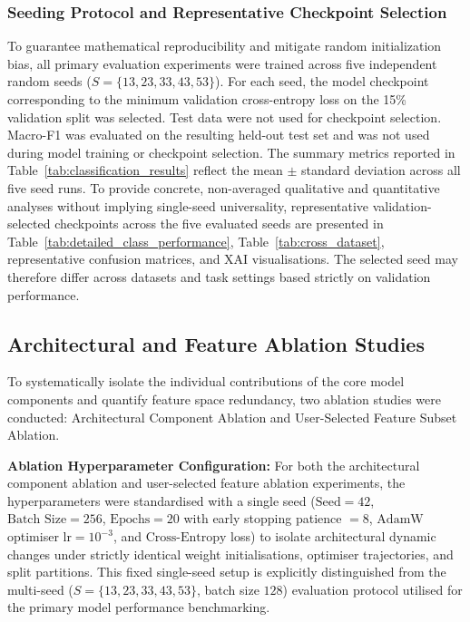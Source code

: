 \documentclass[a4paper,fleqn]{cas-sc}
\begin{document}
\subsubsection{Seeding Protocol and Representative Checkpoint Selection}
To guarantee mathematical reproducibility and mitigate random initialization bias, all primary evaluation experiments were trained across five independent random seeds ($S = \{13, 23, 33, 43, 53\}$). For each seed, the model checkpoint corresponding to the minimum validation cross-entropy loss on the 15\% validation split was selected. Test data were not used for checkpoint selection. Macro-F1 was evaluated on the resulting held-out test set and was not used during model training or checkpoint selection. The summary metrics reported in Table~\ref{tab:classification_results} reflect the mean $\pm$ standard deviation across all five seed runs. To provide concrete, non-averaged qualitative and quantitative analyses without implying single-seed universality, representative validation-selected checkpoints across the five evaluated seeds are presented in Table~\ref{tab:detailed_class_performance}, Table~\ref{tab:cross_dataset}, representative confusion matrices, and XAI visualisations. The selected seed may therefore differ across datasets and task settings based strictly on validation performance.


\subsection{Architectural and Feature Ablation Studies}
\label{sec:ablation_studies}

To systematically isolate the individual contributions of the core model components and quantify feature space redundancy, two ablation studies were conducted: Architectural Component Ablation and User-Selected Feature Subset Ablation.


{\color{blue}\textbf{Ablation Hyperparameter Configuration:} For both the architectural component ablation and user-selected feature ablation experiments, the hyperparameters were standardised with a single seed ($\text{Seed} = 42$, $\text{Batch Size} = 256$, $\text{Epochs} = 20$ with early stopping patience $= 8$, $\text{AdamW}$ optimiser $\text{lr} = 10^{-3}$, and $\text{Cross-Entropy}$ loss) to isolate architectural dynamic changes under strictly identical weight initialisations, optimiser trajectories, and split partitions. This fixed single-seed setup is explicitly distinguished from the multi-seed ($S=\{13, 23, 33, 43, 53\}$, batch size $128$) evaluation protocol utilised for the primary model performance benchmarking.}
\end{document}
